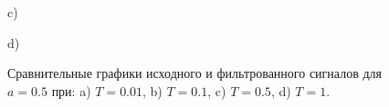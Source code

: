 \documentclass[a5paper, 10pt]{article}
\theoremstyle{definition}
\theoremstyle{plain}
\theoremstyle{remark}
\begin{document}
\begin{figure}[h!]
\begin{minipage}[h!]{0.47\linewidth}
 c) \\
\end{minipage}
\hfill
\begin{minipage}[h!]{0.47\linewidth}
 d) \\
\end{minipage}
\caption{Сравнительные графики исходного и фильтрованного сигналов для $a=0.5$ при: a) $T=0.01$, b)
$T=0.1$, c) $T=0.5$, d) $T=1$.}
\end{figure}
\end{document}
